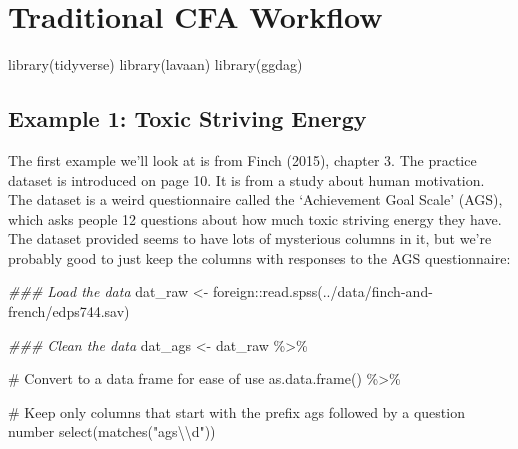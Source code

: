 \documentclass[
  letterpaper,
  DIV=11,
  numbers=noendperiod]{scrreprt}
\newenvironment{Shaded}{\begin{snugshade}}{\end{snugshade}}
\newcommand{\CommentTok}[1]{\textcolor[rgb]{0.37,0.37,0.37}{#1}}
\newcommand{\DocumentationTok}[1]{\textcolor[rgb]{0.37,0.37,0.37}{\textit{#1}}}
\newcommand{\FunctionTok}[1]{\textcolor[rgb]{0.28,0.35,0.67}{#1}}
\newcommand{\NormalTok}[1]{\textcolor[rgb]{0.00,0.23,0.31}{#1}}
\newcommand{\OtherTok}[1]{\textcolor[rgb]{0.00,0.23,0.31}{#1}}
\newcommand{\SpecialCharTok}[1]{\textcolor[rgb]{0.37,0.37,0.37}{#1}}
\newcommand{\StringTok}[1]{\textcolor[rgb]{0.13,0.47,0.30}{#1}}
\begin{document}
\hypertarget{traditional-cfa-workflow}{%
\chapter{Traditional CFA Workflow}\label{traditional-cfa-workflow}}

\begin{Shaded}
\begin{Highlighting}[]
\FunctionTok{library}\NormalTok{(tidyverse)}
\FunctionTok{library}\NormalTok{(lavaan)}
\FunctionTok{library}\NormalTok{(ggdag)}
\end{Highlighting}
\end{Shaded}

\hypertarget{example-1-toxic-striving-energy}{%
\section*{Example 1: Toxic Striving
Energy}\label{example-1-toxic-striving-energy}}

The first example we'll look at is from Finch (2015), chapter 3. The
practice dataset is introduced on page 10. It is from a study about
human motivation. The dataset is a weird questionnaire called the
`Achievement Goal Scale' (AGS), which asks people 12 questions about how
much toxic striving energy they have. The dataset provided seems to have
lots of mysterious columns in it, but we're probably good to just keep
the columns with responses to the AGS questionnaire:

\begin{Shaded}
\begin{Highlighting}[]
\DocumentationTok{\#\#\# Load the data}
\NormalTok{dat\_raw }\OtherTok{\textless{}{-}}\NormalTok{ foreign}\SpecialCharTok{::}\FunctionTok{read.spss}\NormalTok{(}\StringTok{\textquotesingle{}../data/finch{-}and{-}french/edps744.sav\textquotesingle{}}\NormalTok{) }
  
\DocumentationTok{\#\#\# Clean the data}
\NormalTok{dat\_ags }\OtherTok{\textless{}{-}}\NormalTok{ dat\_raw }\SpecialCharTok{\%\textgreater{}\%} 

  \CommentTok{\# Convert to a data frame for ease of use}
  \FunctionTok{as.data.frame}\NormalTok{() }\SpecialCharTok{\%\textgreater{}\%} 
  
  \CommentTok{\# Keep only columns that start with the prefix \textquotesingle{}ags\textquotesingle{} followed by a question number}
  \FunctionTok{select}\NormalTok{(}\FunctionTok{matches}\NormalTok{(}\StringTok{"ags}\SpecialCharTok{\textbackslash{}\textbackslash{}}\StringTok{d"}\NormalTok{)) }
\end{Highlighting}
\end{Shaded}
\end{document}

